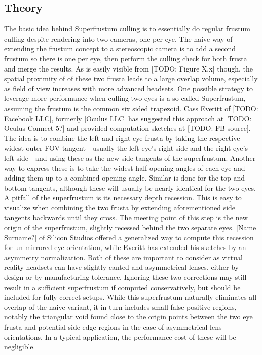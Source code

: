 \subsection{Theory}
The basic idea behind Superfrustum culling is to essentially do regular frustum culling despite rendering into two cameras, one per eye. The naive way of extending the frustum concept to a stereoscopic camera is to add a second frustum so there is one per eye, then perform the culling check for both frusta and merge the results. 
As is easily visible from [TODO: Figure X.x] though, the spatial proximity of of these two frusta leads to a large overlap volume, especially as field of view increases with more advanced headsets. One possible strategy to leverage more performance when culling two eyes is a so-called Superfrustum, assuming the frustum is the common six sided trapezoid. Cass Everitt of [TODO: Facebook LLC], formerly [Oculus LLC] has suggested this approach at [TODO: Oculus Connect 5?] and provided computation sketches at [TODO: FB source]. The idea is to combine the left and right eye frusta by taking the respective widest outer FOV tangent - usually the left eye's right side and the right eye's left side - and using these as the new side tangents of the superfrustum. Another way to express these is to take the widest half opening angles of each eye and adding them up to a combined opening angle. Similar is done for the top and bottom tangents, although these will usually be nearly identical for the two eyes. 
A pitfall of the superfrustum is its necessary depth recession. This is easy to visualize when combining the two frusta by extending aforementioned side tangents backwards until they cross. The meeting point of this step is the new origin of the superfrustum, slightly recessed behind the two separate eyes. 
[Name Surname?] of Silicon Studios offered a generalized way to compute this recession for un-mirrored eye orientation, while Everitt has extended his sketches by an asymmetry normalization. Both of these are important to consider as virtual reality headsets can have slightly canted and asymmetrical lenses, either by design or by manufacturing tolerance. Ignoring these two corrections may still result in a sufficient superfrustum if computed conservatively, but should be included for fully correct setups. 
While this superfrustum naturally eliminates all overlap of the naive variant, it in turn includes small false positive regions, notably the triangular void found close to the origin points between the two eye frusta and potential side edge regions in the case of asymmetrical lens orientations. In a typical application, the performance cost of these will be negligible. \\

